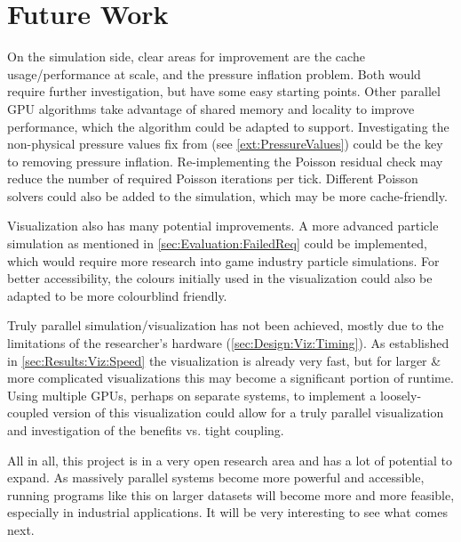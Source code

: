 \section{Future Work}

On the simulation side, clear areas for improvement are the cache usage/performance at scale, and the pressure inflation problem.
Both would require further investigation, but have some easy starting points.
Other parallel GPU algorithms take advantage of shared memory and locality to improve performance, which the algorithm could be adapted to support.
Investigating the non-physical pressure values fix from \cite{book:griebel1998numerical} (see \cref{ext:PressureValues}) could be the key to removing pressure inflation.
Re-implementing the Poisson residual check may reduce the number of required Poisson iterations per tick.
Different Poisson solvers could also be added to the simulation, which may be more cache-friendly.

Visualization also has many potential improvements.
A more advanced particle simulation as mentioned in \cref{sec:Evaluation:FailedReq} could be implemented, which would require more research into game industry particle simulations.
For better accessibility, the colours initially used in the visualization could also be adapted to be more colourblind friendly.

Truly parallel simulation/visualization has not been achieved, mostly due to the limitations of the researcher's hardware (\cref{sec:Design:Viz:Timing}).
As established in \cref{sec:Results:Viz:Speed} the visualization is already very fast, but for larger \& more complicated visualizations this may become a significant portion of runtime.
Using multiple GPUs, perhaps on separate systems, to implement a loosely-coupled version of this visualization could allow for a truly parallel visualization and investigation of the benefits vs. tight coupling.

All in all, this project is in a very open research area and has a lot of potential to expand.
As massively parallel systems become more powerful and accessible, running programs like this on larger datasets will become more and more feasible, especially in industrial applications.
It will be very interesting to see what comes next.

